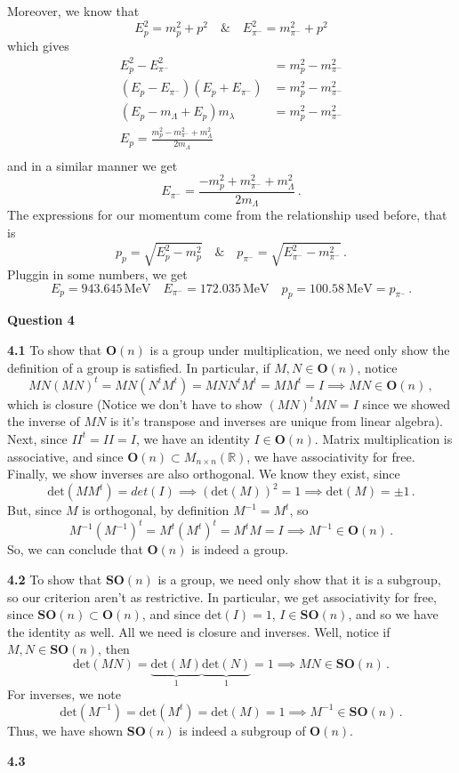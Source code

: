 \documentclass[10pt]{article}
\newcommand{\R}{\mathbb{R}}
\begin{document}
Moreover, we know that
\[ E_{p}^{2} = m_{p}^{2} + p^{2} \quad \& \quad E_{\pi^{-}}^{2} = m_{\pi^{-}}^{2} + p^{2} \]
which gives
\begin{equation*}
  \begin{split}
    E_{p}^{2} - E_{\pi^{-}}^{2} & = m_{p}^{2} - m_{\pi^{-}}^{2} \\
    (E_{p} - E_{\pi^{-}})(E_{p} + E_{\pi^{-}}) & =  m_{p}^{2} - m_{\pi^{-}}^{2} \\
    (E_{p} - m_{\Lambda} + E_{p})m_{\lambda} & = m_{p}^{2} - m_{\pi^{-}}^{2} \\
    E_{p} = \frac{m_{p}^{2} - m_{\pi^{-}}^{2} + m_{\Lambda}^{2}}{2m_{\Lambda}} \\
  \end{split}
\end{equation*}
and in a similar manner we get
\[ E_{\pi^{-}} = \frac{- m_{p}^{2} + m_{\pi^{-}}^{2} + m_{\Lambda}^{2}}{2m_{\Lambda}} \, .\]
The expressions for our momentum come from the relationship used before, that is
\[ p_{p} = \sqrt{E_{p}^{2} - m_{p}^{2}} \quad \& \quad p_{\pi^{-}} = \sqrt{E_{\pi^{-}}^{2} - m_{\pi^{-}}^{2}}\, . \]
Pluggin in some numbers, we get
\[ E_{p} = 943.645 \,\text{MeV} \quad E_{\pi^{-}} = 172.035 \, \text{MeV} \quad p_{p} = 100.58 \,\text{MeV} = p_{\pi^{-}} \, .\]

\textbf{Question 4}

\textbf{4.1}  To show that $\textbf{O}(n)$ is a group under multiplication, we need only show the definition of a group is satisfied. In particular, if $M,N \in \textbf{O}(n)$, notice
\[ MN(MN)^{t} = MN(N^{t}M^{t}) = MNN^{t}M^{t} = MM^{t} = I \implies MN \in \textbf{O}(n) \, ,\]
which is closure (Notice we don't have to show $(MN)^{t}MN = I$ since we showed the inverse of $MN$ is it's transpose and inverses are unique from linear algebra). Next, since $II^{t} = II = I$, we have an identity $I\in \textbf{O}(n)$. Matrix multiplication is associative, and since $\textbf{O}(n) \subset M_{n\times n}(\R)$, we have associativity for free. Finally, we show inverses are also orthogonal. We know they exist, since
\[ \text{det}(MM^{t}) = det(I) \implies (\text{det}(M))^{2} = 1 \implies \text{det}(M) = \pm 1\, .\]
But, since $M$ is orthogonal, by definition $M^{-1} = M^{t}$, so
\[ M^{-1}(M^{-1})^{t} = M^{t}(M^{t})^{t} = M^{t}M = I  \implies M^{-1} \in \textbf{O}(n)\, .\]
So, we can conclude that $\textbf{O}(n)$ is indeed a group.

\textbf{4.2} To show that $\textbf{SO}(n)$ is a group, we need only show that it is a subgroup, so our criterion aren't as restrictive. In particular, we get associativity for free, since $\textbf{SO}(n) \subset \textbf{O}(n)$, and since $\text{det}(I) = 1$, $I \in \textbf{SO}(n)$, and so we have the identity as well. All we need is closure and inverses. Well, notice if $M,N \in \textbf{SO}(n)$, then
\[ \text{det}(MN) = \underbrace{\text{det}(M)}_{1}\underbrace{\text{det}(N)}_{1} = 1 \implies MN \in \textbf{SO}(n) \, .\]
For inverses, we note
\[ \text{det}(M^{-1}) = \text{det}(M^{t}) = \text{det}(M) = 1 \implies M^{-1} \in \textbf{SO}(n)\, .\]
Thus, we have shown $\textbf{SO}(n)$ is indeed a subgroup of $\textbf{O}(n)$.

\textbf{4.3} 
\end{document}
